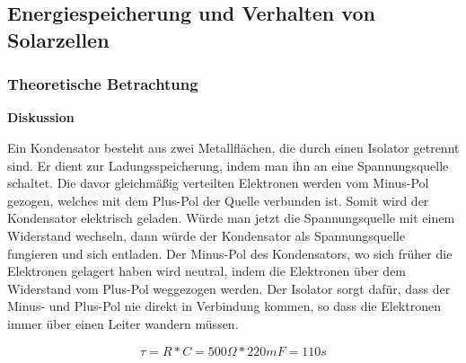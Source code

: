 \subsection {Energiespeicherung und Verhalten von Solarzellen}      %
    \subsubsection{Theoretische Betrachtung}                            %
        \textbf{Diskussion}
        \newline
        \par Ein Kondensator besteht aus zwei Metallflächen, die durch einen Isolator getrennt sind. Er dient zur Ladungsspeicherung, indem man ihn an eine Spannungsquelle schaltet. Die davor gleichmäßig verteilten Elektronen werden vom Minus-Pol gezogen, welches mit dem Plus-Pol der Quelle verbunden ist. Somit wird der Kondensator elektrisch geladen. Würde man jetzt die Spannungsquelle mit einem Widerstand wechseln, dann würde der Kondensator als Spannungsquelle fungieren und sich entladen. Der Minus-Pol des Kondensators, wo sich früher die Elektronen gelagert haben wird neutral, indem die Elektronen über dem Widerstand vom Plus-Pol weggezogen werden. Der Isolator sorgt dafür, dass der Minus- und Plus-Pol nie direkt in Verbindung kommen, so dass die Elektronen immer über einen Leiter wandern müssen.
        
        $$
            \tau = R * C = 500 \Omega * 220mF = 110s
        $$
        
